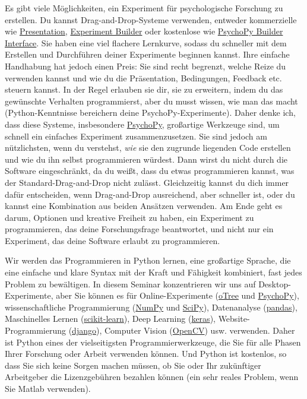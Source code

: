 \documentclass[
]{book}
\begin{document}
Es gibt viele Möglichkeiten, ein Experiment für psychologische Forschung zu erstellen. Du kannst Drag-and-Drop-Systeme verwenden, entweder kommerzielle wie \href{https://www.neurobs.com/}{Presentation}, \href{https://www.sr-research.com/experiment-builder/}{Experiment Builder} oder kostenlose wie \href{https://psychopy.org/builder}{PsychoPy Builder Interface}. Sie haben eine viel flachere Lernkurve, sodass du schneller mit dem Erstellen und Durchführen deiner Experimente beginnen kannst. Ihre einfache Handhabung hat jedoch einen Preis: Sie sind recht begrenzt, welche Reize du verwenden kannst und wie du die Präsentation, Bedingungen, Feedback etc. steuern kannst. In der Regel erlauben sie dir, sie zu erweitern, indem du das gewünschte Verhalten programmierst, aber du musst wissen, wie man das macht (Python-Kenntnisse bereichern deine PsychoPy-Experimente). Daher denke ich, dass diese Systeme, insbesondere \href{https://psychopy.org/}{PsychoPy}, großartige Werkzeuge sind, um schnell ein einfaches Experiment zusammenzusetzen. Sie sind jedoch am nützlichsten, wenn du verstehst, \emph{wie} sie den zugrunde liegenden Code erstellen und wie du ihn selbst programmieren würdest. Dann wirst du nicht durch die Software eingeschränkt, da du weißt, dass du etwas programmieren kannst, was der Standard-Drag-and-Drop nicht zulässt. Gleichzeitig kannst du dich immer dafür entscheiden, wenn Drag-and-Drop ausreichend, aber schneller ist, oder du kannst eine Kombination aus beiden Ansätzen verwenden. Am Ende geht es darum, Optionen und kreative Freiheit zu haben, ein Experiment zu programmieren, das deine Forschungsfrage beantwortet, und nicht nur ein Experiment, das deine Software erlaubt zu programmieren.

Wir werden das Programmieren in Python lernen, eine großartige Sprache, die eine einfache und klare Syntax mit der Kraft und Fähigkeit kombiniert, fast jedes Problem zu bewältigen. In diesem Seminar konzentrieren wir uns auf Desktop-Experimente, aber Sie können es für Online-Experimente (\href{https://otree.readthedocs.io/en/latest/}{oTree} und \href{https://psychopy.org/}{PsychoPy}), wissenschaftliche Programmierung (\href{https://numpy.org/}{NumPy} und \href{https://www.scipy.org/}{SciPy}), Datenanalyse (\href{https://pandas.pydata.org/}{pandas}), Maschinelles Lernen (\href{https://scikit-learn.org/}{scikit-learn}), Deep Learning (\href{https://keras.io/}{keras}), Website-Programmierung (\href{https://www.djangoproject.com/}{django}), Computer Vision (\href{https://opencv.org/}{OpenCV}) usw. verwenden. Daher ist Python eines der vielseitigsten Programmierwerkzeuge, die Sie für alle Phasen Ihrer Forschung oder Arbeit verwenden können. Und Python ist kostenlos, so dass Sie sich keine Sorgen machen müssen, ob Sie oder Ihr zukünftiger Arbeitgeber die Lizenzgebühren bezahlen können (ein sehr reales Problem, wenn Sie Matlab verwenden).
\end{document}
